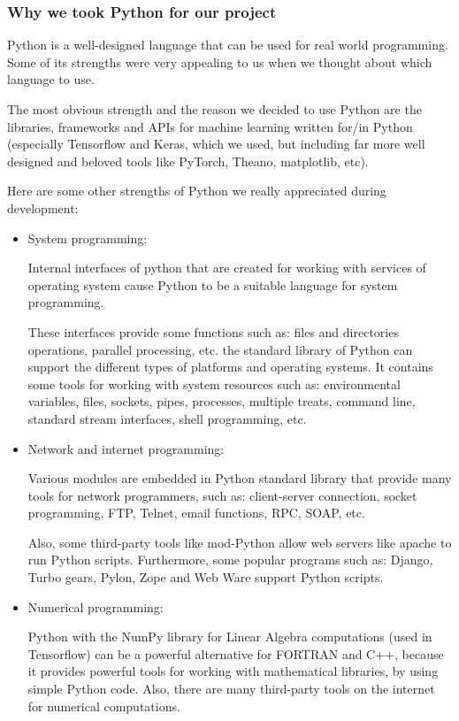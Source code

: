 \subsubsection{Why we took Python for our project}

Python is a well-designed language that can be used for
real world programming. Some of its strengths were very
appealing to us when we thought about which language to
use.

The most obvious strength and the reason we decided to use
Python are the libraries,
frameworks and APIs for machine learning written for/in
Python (especially Tensorflow and Keras, which we used, but
including far more well designed and beloved tools like
PyTorch, Theano, matplotlib, etc).

Here are some other strengths of Python we really
appreciated during development:

\begin{itemize}

  \item System programming:

        Internal interfaces of python that are created for
        working with services of operating system cause
        Python to be a suitable language for system
        programming.

        These interfaces provide some functions such as:
        files and directories operations, parallel
        processing, etc. the standard library of Python can
        support the different types of platforms and
        operating systems. It contains some tools for
        working with system resources such as:
        environmental variables, files, sockets, pipes,
        processes, multiple treats, command line, standard
        stream interfaces, shell programming, etc.
        \cite{amjad21}


  \item Network and internet programming:

        Various modules are embedded in Python standard
        library that provide many tools for network
        programmers, such as: client-server connection,
        socket programming, FTP, Telnet, email functions,
        RPC, SOAP, etc.

        Also, some third-party tools like mod-Python allow
        web servers like apache to run Python scripts.
        Furthermore, some popular programs such as: Django,
        Turbo gears, Pylon, Zope and Web Ware support
        Python scripts.\cite{amjad21}

  \item Numerical programming:

        Python with the NumPy library for
        Linear Algebra computations (used in Tensorflow)
        can be a powerful alternative for FORTRAN and C++,
        because it provides powerful tools for working with
        mathematical libraries, by using simple Python
        code. Also, there are many third-party tools on
        the internet for numerical computations.

\end{itemize}
